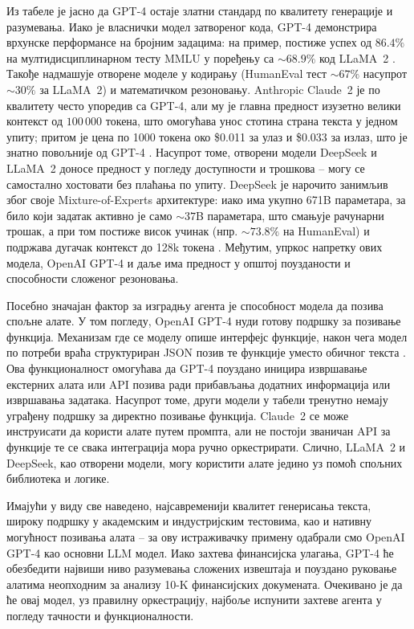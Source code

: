 Из табеле је јасно да GPT-4 остаје златни стандард по квалитету генерације и разумевања. Иако је власнички модел затвореног кода, GPT-4 демонстрира врхунске перформансе на бројним задацима: на пример, постиже успех од \(86.4\%\) на мултидисциплинарном тесту MMLU у поређењу са \(\sim68.9\%\) код LLaMA~2 \cite{cheung_llama2_vs_gpt4_2023}. Такође надмашује отворене моделе у кодирању (HumanEval тест \(\sim67\%\) насупрот \(\sim30\%\) за LLaMA~2) и математичком резоновању. Anthropic Claude~2 је по квалитету често упоредив са GPT-4, али му је главна предност изузетно велики контекст од \(100\,000\) токена, што омогућава унос стотина страна текста у једном упиту; притом је цена по 1000 токена око \$0.011 за улаз и \$0.033 за излаз, што је знатно повољније од GPT-4 \cite{anthropic_best_practices_2025}. Насупрот томе, отворени модели DeepSeek и LLaMA~2 доносе предност у погледу доступности и трошкова -- могу се самостално хостовати без плаћања по упиту. DeepSeek је нарочито занимљив због своје Mixture-of-Experts архитектуре: иако има укупно 671B параметара, за било који задатак активно је само \(\sim37\)B параметара, што смањује рачунарни трошак, а при том постиже висок учинак (нпр. \(\sim73.8\%\) на HumanEval) и подржава дугачак контекст до 128k токена \cite{kramer_deepseek_2025}. Међутим, упркос напретку ових модела, OpenAI GPT-4 и даље има предност у општој поузданости и способности сложеног резоновања.
\newline

Посебно значајан фактор за изградњу агента је способност модела да позива спољне алате. У том погледу, OpenAI GPT-4 нуди готову подршку за позивање функција. Механизам где се моделу опише интерфејс функције, након чега модел по потреби враћа структуриран JSON позив те функције уместо обичног текста \cite{openai_function_calling_2023}. Ова функционалност омогућава да GPT-4 поуздано иницира извршавање екстерних алата или API позива ради прибављања додатних информација или извршавања задатака. Насупрот томе, други модели у табели тренутно немају уграђену подршку за директно позивање функција. Claude~2 се може инструисати да користи алате путем промпта, али не постоји званичан API за функције те се свака интеграција мора ручно оркестрирати. Слично, LLaMA~2 и DeepSeek, као отворени модели, могу користити алате једино уз помоћ спољних библиотека и логике.
\newline

Имајући у виду све наведено, најсавременији квалитет генерисања текста, широку подршку у академским и индустријским тестовима, као и нативну могућност позивања алата -- за ову истраживачку примену одабрали смо OpenAI GPT-4 као основни LLM модел. Иако захтева финансијска улагања, GPT-4 ће обезбедити највиши ниво разумевања сложених извештаја и поуздано руковање алатима неопходним за анализу 10-K финансијских докумената. Очекивано је да ће овај модел, уз правилну оркестрацију, најбоље испунити захтеве агента у погледу тачности и функционалности.


